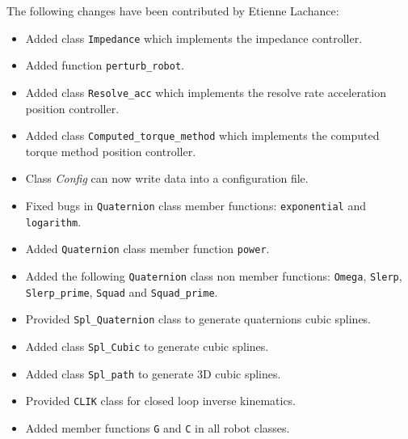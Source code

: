 \documentclass[11pt,fleqn,letterpaper]{report}
\begin{document}
\begin{description}
  The following changes have been contributed by Etienne Lachance:
  \begin{itemize}
  \item Added class \texttt{Impedance} which implements the impedance
    controller.
  \item Added function \texttt{perturb\_robot}.
  \item Added class \texttt{Resolve\_acc} which implements the resolve
    rate acceleration position controller.
  \item Added class \texttt{Computed\_torque\_method} which implements
    the computed torque method position controller.
  \item Class \emph{Config} can now write data into a configuration
    file.
  \item Fixed bugs in \texttt{Quaternion} class member functions:
    \texttt{exponential} and \texttt{logarithm}.
  \item Added \texttt{Quaternion} class member function
    \texttt{power}.
  \item Added the following \texttt{Quaternion} class non member
    functions: \texttt{Omega}, \texttt{Slerp}, \texttt{Slerp\_prime},
    \texttt{Squad} and \texttt{Squad\_prime}.
  \item Provided \texttt{Spl\_Quaternion} class to generate
    quaternions cubic splines.
  \item Added class \texttt{Spl\_Cubic} to generate cubic splines.
  \item Added class \texttt{Spl\_path} to generate 3D cubic splines.
  \item Provided \texttt{CLIK} class for closed loop inverse
    kinematics.
  \item Added member functions \texttt{G} and \texttt{C} in all robot
    classes.
  \end{itemize}


\end{description}
\end{document}
